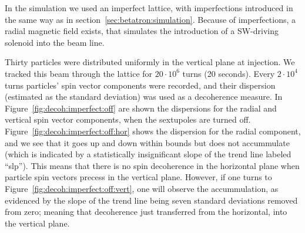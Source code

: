 \documentclass[preprint, review]{elsarticle}
\begin{document}
In the simulation we used an imperfect lattice, with imperfections introduced in the same way as
in section~\ref{sec:betatron:simulation}. Because of imperfections, a radial magnetic field exists, that
simulates the introduction of a SW-driving solenoid into the beam line.

Thirty particles were distributed uniformly in the vertical plane at injection. We tracked this beam through
the lattice for $20\cdot 10^6$ turns (20 seconds). Every $2\cdot10^4$ turns particles'
spin vector components were recorded, and their dispersion (estimated as the standard deviation) was used
as a decoherence measure. In Figure~\ref{fig:decoh:imperfect:off} are shown the dispersions for the
radial and vertical spin vector components, when the sextupoles are turned off.
Figure~\ref{fig:decoh:imperfect:off:hor} shows the dispersion for the radial component, and we see that it
goes up and down within bounds but does not accummulate (which is indicated by
a statistically insignificant slope of the trend line labeled ``slp'').
This means that there is no spin decoherence in the horizontal plane when particle spin vectors precess
in the vertical plane. However, if one turns to Figure~\ref{fig:decoh:imperfect:off:vert}, one will
observe the accummulation, as evidenced by the slope of the trend line being
seven standard deviations removed from zero; meaning that decoherence just transferred from the horizontal,
into the vertical plane.
\end{document}
